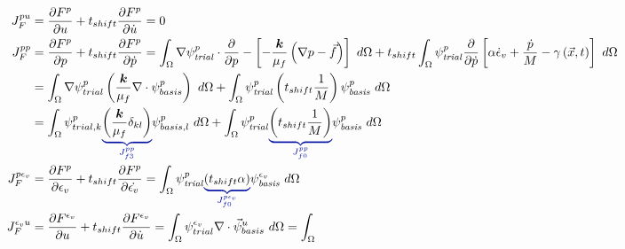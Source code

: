 \begin{align}
  J_F^{pu}                       & = \frac{\partial F^p}{\partial u} + t_{shift} \frac{\partial F^p}{\partial \dot{u}} = 0                                                                                                                                    \\
  J_F^{pp}                       & = \frac{\partial F^p}{\partial p} + t_{shift} \frac{\partial F^p}{\partial \dot{p}} =
  \int_{\Omega} \nabla \trialscalar[p] \cdot \frac{\partial}{\partial p} -\left[-\frac{\tensor{k}}{\mu_{f}} \left(\nabla p - \vec{f} \right) \right] \ d\Omega  +
  t_{shift}\int_{\Omega} \trialscalar[p] \frac{\partial}{\partial \dot{p}} \left[\alpha\dot{\epsilon}_{v} + \frac{\dot{p}}{M} - \gamma\left(\vec{x},t\right)\right] \ d\Omega                                                                                 \\
                                 & = \int_{\Omega} \nabla \psi_{trial}^ p \left(\frac{\tensor{k}}{\mu_{f}} \nabla \cdot \psi_{basis}^p \right) \ d\Omega +
  \int_{\Omega} \trialscalar[p] \left(t_{shift} \frac{1}{M}\right) \basisscalar[p] \ d\Omega                                                                                                                                                                  \\
                                 & = \int_{\Omega} \psi_{trial,k}^p \eqnannotate{\left(\frac{\tensor{k}}{\mu_{f}} \delta_{kl}\right)}{J_{f3}^{pp}} \psi_{basis,l}^p \ d\Omega +
  \int_{\Omega} \trialscalar[p] \eqnannotate{\left(t_{shift} \frac{1}{M}\right)}{J_{f0}^{pp}} \basisscalar[p] \ d\Omega                                                                                                                                       \\
  J_F^{p\epsilon_{v}}            & = \frac{\partial F^p}{\partial \epsilon_{v}} + t_{shift} \frac{\partial
    F^p}{\partial \dot{\epsilon_{v}}} = \int_{\Omega} \trialscalar[p] \eqnannotate{\left(t_{shift} \alpha \right)}{J_{f0}^{p\epsilon_{v}}}
  \basisscalar[\epsilon_{v}] \ d\Omega                                                                                                                                                                                                                        \\
  J_F^{\epsilon_{v}u}            & = \frac{\partial F^{\epsilon_{v}}}{\partial u} + t_{shift} \frac{\partial F^{\epsilon_{v}}}{\partial \dot{u}} =
  \int_{\Omega} \psi_{trial}^{\epsilon_{v}} \nabla \cdot \vec{\psi}_{basis}^u \ d\Omega = \int_{\Omega}

\end{align}
